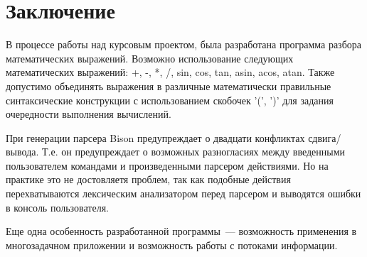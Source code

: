 
\section*{Заключение}
\label{sec:conclusion}

В процессе работы над курсовым проектом, была разработана программа
разбора математических выражений. Возможно использование следующих
математических выражений: +, -, *, /, sin, cos, tan, asin, acos,
atan. Также допустимо объединять выражения в различные математически
правильные синтаксические конструкции с использованием скобочек '(',
')' для задания очередности выполнения вычислений.

При генерации парсера Bison предупреждает о двадцати конфликтах
сдвига/вывода.  Т.е. он предупреждает о возможных разногласиях между
введенными пользователем командами и произведенными парсером
действиями.  Но на практике это не достовляетя проблем, так как
подобные действия перехватываются лексическим анализатором перед
парсером и выводятся ошибки в консоль пользователя.

Еще одна особенность разработанной программы~--- возможность
применения в многозадачном приложении и возможность работы с потоками
информации.


